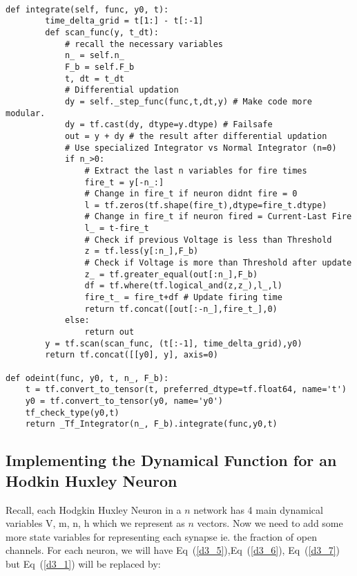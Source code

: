 \documentclass[10pt,letterpaper]{article}
\begin{document}
\begin{verbatim}

def integrate(self, func, y0, t): 
        time_delta_grid = t[1:] - t[:-1]
        def scan_func(y, t_dt): 
            # recall the necessary variables
            n_ = self.n_
            F_b = self.F_b
            t, dt = t_dt
            # Differential updation
            dy = self._step_func(func,t,dt,y) # Make code more modular.
            dy = tf.cast(dy, dtype=y.dtype) # Failsafe
            out = y + dy # the result after differential updation
            # Use specialized Integrator vs Normal Integrator (n=0)
            if n_>0:
                # Extract the last n variables for fire times
                fire_t = y[-n_:] 
                # Change in fire_t if neuron didnt fire = 0
                l = tf.zeros(tf.shape(fire_t),dtype=fire_t.dtype) 
                # Change in fire_t if neuron fired = Current-Last Fire
                l_ = t-fire_t 
                # Check if previous Voltage is less than Threshold
                z = tf.less(y[:n_],F_b)              
                # Check if Voltage is more than Threshold after update
                z_ = tf.greater_equal(out[:n_],F_b)  
                df = tf.where(tf.logical_and(z,z_),l_,l) 
                fire_t_ = fire_t+df # Update firing time 
                return tf.concat([out[:-n_],fire_t_],0)
            else:
                return out
        y = tf.scan(scan_func, (t[:-1], time_delta_grid),y0)
        return tf.concat([[y0], y], axis=0)
        
def odeint(func, y0, t, n_, F_b):
    t = tf.convert_to_tensor(t, preferred_dtype=tf.float64, name='t')
    y0 = tf.convert_to_tensor(y0, name='y0')
    tf_check_type(y0,t)
    return _Tf_Integrator(n_, F_b).integrate(func,y0,t)
\end{verbatim}

\subsection*{Implementing the Dynamical Function for an Hodkin Huxley Neuron}

Recall, each Hodgkin Huxley Neuron in a $n$ network has 4 main dynamical variables V, m, n, h which we represent as $n$ vectors. Now we need to add some more state variables for representing each synapse ie. the fraction of open channels. For each neuron, we will have Eq~(\ref{d3_5}),Eq~(\ref{d3_6}), Eq~(\ref{d3_7}) but Eq~(\ref{d3_1}) will be replaced by:
\end{document}
